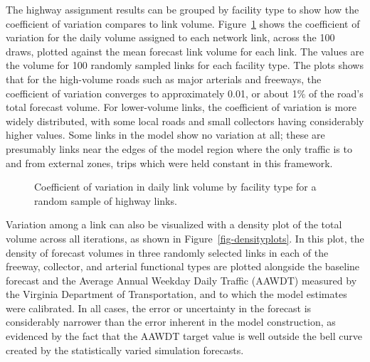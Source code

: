 \documentclass[
  futuretransp,
  submit,
  moreauthors,
]{Definitions/mdpi}
\begin{document}
The highway assignment results can be grouped by facility type to show
how the coefficient of variation compares to link volume.
Figure~\ref{fig-totalvolume} shows the coefficient of variation for the
daily volume assigned to each network link, across the 100 draws,
plotted against the mean forecast link volume for each link. The values
are the volume for 100 randomly sampled links for each facility type.
The plots shows that for the high-volume roads such as major arterials
and freeways, the coefficient of variation converges to approximately
0.01, or about 1\% of the road's total forecast volume. For lower-volume
links, the coefficient of variation is more widely distributed, with
some local roads and small collectors having considerably higher values.
Some links in the model show no variation at all; these are presumably
links near the edges of the model region where the only traffic is to
and from external zones, trips which were held constant in this
framework.

\begin{figure}


\caption{\label{fig-totalvolume}Coefficient of variation in daily link
volume by facility type for a random sample of highway links.}

\end{figure}%

Variation among a link can also be visualized with a density plot of the
total volume across all iterations, as shown in
Figure~\ref{fig-densityplots}. In this plot, the density of forecast
volumes in three randomly selected links in each of the freeway,
collector, and arterial functional types are plotted alongside the
baseline forecast and the Average Annual Weekday Daily Traffic (AAWDT)
measured by the Virginia Department of Transportation, and to which the
model estimates were calibrated. In all cases, the error or uncertainty
in the forecast is considerably narrower than the error inherent in the
model construction, as evidenced by the fact that the AAWDT target value
is well outside the bell curve created by the statistically varied
simulation forecasts.
\end{document}
